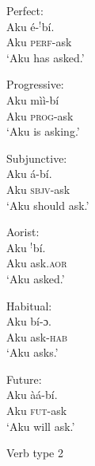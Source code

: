\documentclass[output=paper
,newtxmath
,modfonts
,nonflat]{langsci/langscibook}
\begin{document}
\begin{minipage}{.5\textwidth}
\ea \label{ex:ollennu:2} Perfect:\\
\gll Aku \'e-$^{!}$b\'i. \\
	Aku \textsc{perf}-ask \\
\glt `Aku has asked.'

\ex Progressive:\\
\gll Aku m\`i\`i-b\'i\\
Aku \textsc{prog}-ask\\
\glt `Aku is asking.'

\ex Subjunctive:\\
\gll Aku \'a-b\'i.\\
Aku \textsc{sbjv}-ask\\
\glt `Aku should ask.'
\z
\end{minipage}
\begin{minipage}{.5\textwidth}
\ea Aorist:\\
\gll Aku $^{!}$b\'i.\\
Aku ask.\textsc{aor}\\
\glt `Aku asked.'

\ex Habitual:\\
\gll Aku b\'i-ɔ.\\
Aku ask-\textsc{hab}\\
\glt `Aku asks.'

\ex Future:\\
\gll Aku \`a\'a-b\'i.\\
Aku \textsc{fut}-ask\\
\glt `Aku will ask.'
\z
\end{minipage}\newline

\medskip
Verb type 2
\medskip
\end{document}
